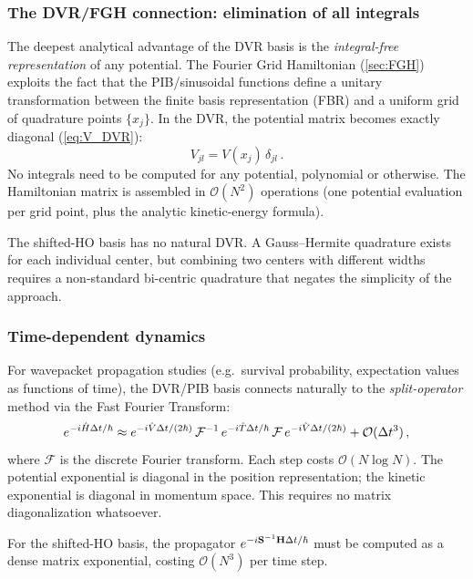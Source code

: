 \subsubsection{The DVR/FGH connection: elimination of all integrals}

The deepest analytical advantage of the DVR basis is the
\emph{integral-free representation} of any potential.  The Fourier Grid Hamiltonian
(\cref{sec:FGH}) exploits the fact that the PIB/sinusoidal functions define a unitary
transformation between the finite basis representation (FBR) and a uniform grid of
quadrature points $\{x_j\}$.  In the DVR, the potential matrix becomes exactly diagonal
(\cref{eq:V_DVR}):
\begin{equation}
  V_{jl} = V(x_j)\,\delta_{jl}\,.
\end{equation}
No integrals need to be computed for any potential, polynomial or otherwise.  The
Hamiltonian matrix is assembled in $\mathcal{O}(N^2)$ operations (one potential
evaluation per grid point, plus the analytic kinetic-energy formula).

The shifted-HO basis has no natural DVR.  A Gauss--Hermite quadrature exists for
each individual center, but combining two centers with different widths requires a
non-standard bi-centric quadrature that negates the simplicity of the approach.

\subsubsection{Time-dependent dynamics}

For wavepacket propagation studies (e.g.\ survival probability, expectation values as
functions of time), the DVR/PIB basis connects naturally to the \emph{split-operator}
method via the Fast Fourier Transform:
\begin{equation}
  e^{-i\hat{H}\Delta t/\hbar}
  \approx e^{-i\hat{V}\Delta t/(2\hbar)}\,\mathcal{F}^{-1}\,
          e^{-i\hat{T}\Delta t/\hbar}\,\mathcal{F}\,
          e^{-i\hat{V}\Delta t/(2\hbar)}
  + \mathcal{O}(\Delta t^3)\,,
\end{equation}
where $\mathcal{F}$ is the discrete Fourier transform.  Each step costs
$\mathcal{O}(N\log N)$.  The potential exponential is diagonal in the position
representation; the kinetic exponential is diagonal in momentum space.  This requires
no matrix diagonalization whatsoever.

For the shifted-HO basis, the propagator $e^{-i\mathbf{S}^{-1}\mathbf{H}\Delta t/\hbar}$
must be computed as a dense matrix exponential, costing $\mathcal{O}(N^3)$ per
time step.

